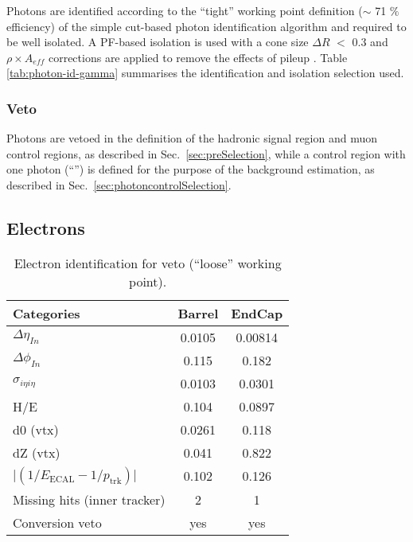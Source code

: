 Photons are identified according to the ``tight'' working point
definition ($\sim$ 71 $\%$ efficiency) of the simple cut-based photon
identification algorithm \cite{photon-id} and required to be well
isolated.  A PF-based isolation is used with a cone size $\Delta R$
$<$ 0.3 and $\rho\times A_{eff}$ corrections are applied to remove the
effects of pileup \cite{pf-photon}.  Table \ref{tab:photon-id-gamma}
summarises the identification and isolation selection used.

\subsubsection{Veto}

Photons are vetoed in the definition of the hadronic signal region and
muon control regions, as described in Sec.~\ref{sec:preSelection},
while a control region with one photon (``\gj'') is defined for the
purpose of the background estimation, as described in
Sec.~\ref{sec:photoncontrolSelection}.


\subsection{Electrons}
\label{sec:electron-id}

\begin{table}[h!]
  \caption{Electron identification for veto (``loose'' working point).\label{tab:ele-id}}
  \centering
  \footnotesize
  \begin{tabular}{ lcc }
    \hline
    \hline
    Categories                                               & Barrel    & EndCap    \\
    \hline
    $\Delta \eta_{In}$                                       & 0.0105   & 0.00814  \\
    $\Delta \phi_{In}$                                       & 0.115    & 0.182  \\
    $\sigma_{i\eta i\eta}$                                   & 0.0103    & 0.0301  \\
    H/E                                                      & 0.104    & 0.0897   \\
    d0 (vtx)                                                 & 0.0261    & 0.118  \\
    dZ (vtx)                                                 & 0.041    & 0.822  \\
    $\lvert(1/E_{\textrm{ECAL}} - 1/p_{\textrm{trk}})\rvert$ & 0.102     & 0.126  \\
    Missing hits (inner tracker)                             & 2         & 1         \\
    Conversion veto                                          & yes       & yes   \\
    \hline
    \hline
  \end{tabular}
\end{table}

